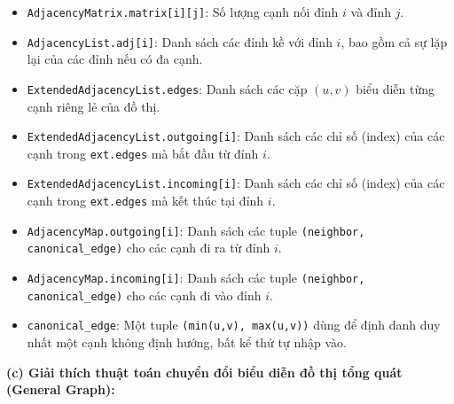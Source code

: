 \documentclass{article}
\begin{document}
\begin{itemize}
    \item \texttt{AdjacencyMatrix.matrix[i][j]}: Số lượng cạnh nối đỉnh $i$ và đỉnh $j$.
    \item \texttt{AdjacencyList.adj[i]}: Danh sách các đỉnh kề với đỉnh $i$, bao gồm cả sự lặp lại của các đỉnh nếu có đa cạnh.
    \item \texttt{ExtendedAdjacencyList.edges}: Danh sách các cặp $(u,v)$ biểu diễn từng cạnh riêng lẻ của đồ thị.
    \item \texttt{ExtendedAdjacencyList.outgoing[i]}: Danh sách các chỉ số (index) của các cạnh trong \texttt{ext.edges} mà bắt đầu từ đỉnh $i$.
    \item \texttt{ExtendedAdjacencyList.incoming[i]}: Danh sách các chỉ số (index) của các cạnh trong \texttt{ext.edges} mà kết thúc tại đỉnh $i$.
    \item \texttt{AdjacencyMap.outgoing[i]}: Danh sách các tuple \texttt{(neighbor, canonical\_edge)} cho các cạnh đi ra từ đỉnh $i$.
    \item \texttt{AdjacencyMap.incoming[i]}: Danh sách các tuple \texttt{(neighbor, canonical\_edge)} cho các cạnh đi vào đỉnh $i$.
    \item \texttt{canonical\_edge}: Một tuple \texttt{(min(u,v), max(u,v))} dùng để định danh duy nhất một cạnh không định hướng, bất kể thứ tự nhập vào.
\end{itemize}



\textbf{(c) Giải thích thuật toán chuyển đổi biểu diễn đồ thị tổng quát (General Graph):}
\end{document}
